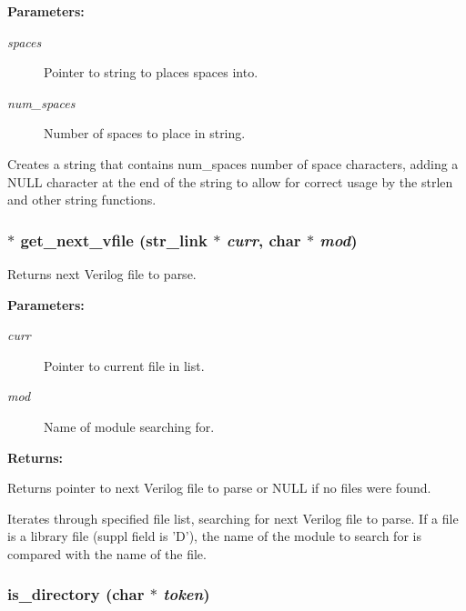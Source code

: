 \begin{Desc}
\item[{\bf Parameters: }]\par
\begin{description}
\item[
{\em spaces}]Pointer to string to places spaces into. \item[
{\em num\_\-spaces}]Number of spaces to place in string.

\end{description}
\end{Desc}
Creates a string that contains num\_\-spaces number of space characters, adding a NULL character at the end of the string to allow for correct usage by the strlen and other string functions. 
\subsubsection{ $\ast$ get\_\-next\_\-vfile ({\bf str\_\-link} $\ast$ {\em curr}, char $\ast$ {\em mod})}\label{util_8c_a18}


Returns next Verilog file to parse.

\begin{Desc}
\item[{\bf Parameters: }]\par
\begin{description}
\item[
{\em curr}]Pointer to current file in list. \item[
{\em mod}]Name of module searching for.

\end{description}
\end{Desc}
\begin{Desc}
\item[{\bf Returns: }]\par
Returns pointer to next Verilog file to parse or NULL if no files were found.

\end{Desc}
Iterates through specified file list, searching for next Verilog file to parse. If a file is a library file (suppl field is 'D'), the name of the module to search for is compared with the name of the file. 
\subsubsection{ is\_\-directory (char $\ast$ {\em token})}\label{util_8c_a9}



